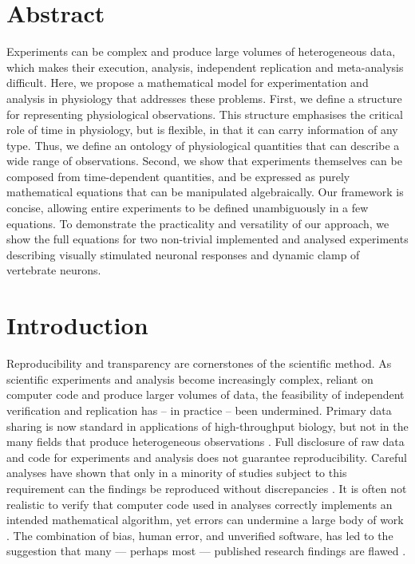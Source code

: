 
\section*{Abstract}

Experiments can be complex and produce large volumes of heterogeneous
data, which makes their execution, analysis, independent replication
and meta-analysis difficult. Here, we propose a mathematical model for
experimentation and analysis in physiology that addresses these
problems. First, we define a structure for representing physiological
observations. This structure emphasises the critical role of time in
physiology, but is flexible, in that it can carry information of any
type. Thus, we define an ontology of physiological quantities that can
describe a wide range of observations. Second, we show that
experiments themselves can be composed from time-dependent quantities,
and be expressed as purely mathematical equations that can be
manipulated algebraically. Our framework is concise, allowing entire
experiments to be defined unambiguously in a few equations. To
demonstrate the practicality and versatility of our approach, we show
the full equations for two non-trivial implemented and analysed
experiments describing visually stimulated neuronal responses and
dynamic clamp of vertebrate neurons. 

\pagebreak

\section*{Introduction}

Reproducibility and transparency are cornerstones of the scientific
method. As scientific experiments and analysis become increasingly
complex, reliant on computer code and produce larger volumes of data,
the feasibility of independent verification and replication has -- in
practice -- been undermined. Primary data sharing is now standard in
applications of high-throughput biology, but not in the many fields
that produce heterogeneous observations \citep{Gardner2005,
  Tukey1962}. Full disclosure of raw data and code for experiments and
analysis does not guarantee reproducibility.  Careful analyses have
shown that only in a minority of studies subject to this requirement
can the findings be reproduced without discrepancies
\citep{Ioannidis2008,Baggerly2009, McCullough2007}. It is often not
realistic to verify that computer code used in analyses correctly
implements an intended mathematical algorithm, yet errors can
undermine a large body of work \citep{Chang2006}. The combination of
bias, human error, and unverified software, has led to the suggestion
that many --- perhaps most --- published research findings are flawed
\citep{Ioannidis2005, Merali2010}.

